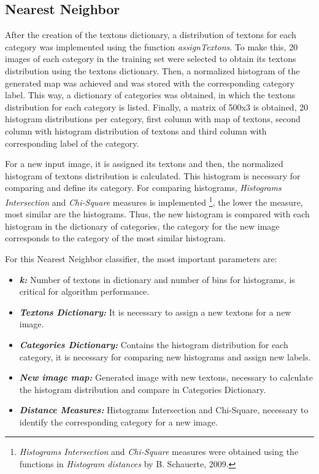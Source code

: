 \documentclass[10pt,twocolumn,letterpaper]{article}
\begin{document}
\subsection{Nearest Neighbor}
After the creation of the textons dictionary, a distribution of textons for each category was implemented using the function \textit{assignTextons}. To make this, 20 images of each category in the training set were selected to obtain its textons distribution using the textons dictionary. Then, a normalized histogram of the generated map was achieved and was stored with the corresponding category label. This way, a dictionary of categories was obtained, in which the textons distribution for each category is listed. Finally, a matrix of 500x3 is obtained, 20 histogram distributions per category, first column with map of textons, second column with histogram distribution of textons and third column with corresponding label of the category.

For a new input image, it is assigned its textons and then, the normalized histogram of textons distribution is calculated. This histogram is necessary for comparing and define its category. For comparing histograms, \textit{Histograms Intersection} and \textit{Chi-Square} measures is implemented \footnote{\textit{Histograms Intersection} and \textit{Chi-Square} measures were obtained using the functions in \textit{
Histogram distances} by B. Schauerte, 2009.}, the lower the measure, most similar are the histograms. Thus, the new histogram is compared with each histogram in the dictionary of categories, the category for the new image corresponds to the category of the most similar histogram.

For this Nearest Neighbor classifier, the most important parameters are:
\begin{itemize}
\item{\textbf{\textit{k:}}} Number of textons in dictionary and number of bins for histograms, is critical for algorithm performance.
\item{\textbf{\textit{Textons Dictionary:}}} It is necessary to assign a new textons for a new image. 
\item{\textbf{\textit{Categories Dictionary:}}} Contains the histogram distribution for each category, it is necessary for comparing new histograms and assign new labels.
\item{\textbf{\textit{New image map:}}} Generated image with new textons, necessary to calculate the histogram distribution and compare in Categories Dictionary.
\item{\textbf{\textit{Distance Measures:}}} Histograms Intersection and Chi-Square, necessary to identify the corresponding category for a new image.
\end{itemize}
\end{document}

